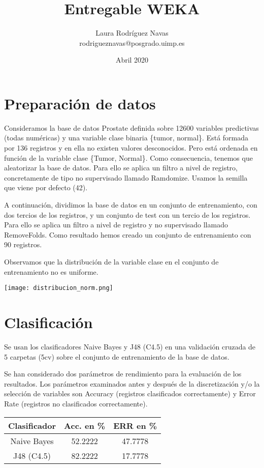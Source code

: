 \documentclass{article}
\title{Entregable WEKA}
\author{Laura Rodríguez Navas \\ rodrigueznavas@posgrado.uimp.es}
\date{Abril 2020}
\begin{document}
\maketitle

\section*{Preparación de datos}

Consideramos la base de datos Prostate definida sobre 12600 variables predictivas (todas numéricas) y una variable clase binaria \{tumor, normal\}. Está formada por 136 registros y en ella no existen valores desconocidos. Pero está ordenada en función de la variable clase \{Tumor, Normal\}. Como consecuencia, tenemos que aleatorizar la base de datos. Para ello se aplica un filtro a nivel de registro, concretamente de tipo no supervisado llamado Ramdomize. Usamos la semilla que viene por defecto (42).

A continuación, dividimos la base de datos en un conjunto de entrenamiento, con dos tercios de los registros, y un conjunto de test con un tercio de los registros. Para ello se aplica un filtro a nivel de registro y no supervisado llamado RemoveFolds. Como resultado hemos creado un conjunto de entrenamiento con 90 registros.

Observamos que la distribución de la variable clase en el conjunto de entrenamiento no es uniforme.

\begin{center}
	\texttt{[image: distribucion\_norm.png]}
\end{center}

\section*{Clasificación}

Se usan los clasificadores Naive Bayes y J48 (C4.5) en una validación cruzada de 5 carpetas (5cv) sobre el conjunto de entrenamiento de la base de datos.

Se han considerado dos parámetros de rendimiento para la evaluación de los resultados. Los parámetros examinados antes y después de la discretización y/o la selección de variables son Accuracy (registros clasificados correctamente) y Error Rate (registros no clasificados correctamente). 

\newpage

\begin{center}
	\begin{tabular}{ |c|c|c| } 
		\hline
		Clasificador & Acc. en \% & ERR en \% \\
		\hline
		Naive Bayes & 52.2222 & 47.7778 \\ 
		J48 (C4.5) & 82.2222 & 17.7778 \\ 
		\hline
	\end{tabular}
\end{center}
\end{document}
